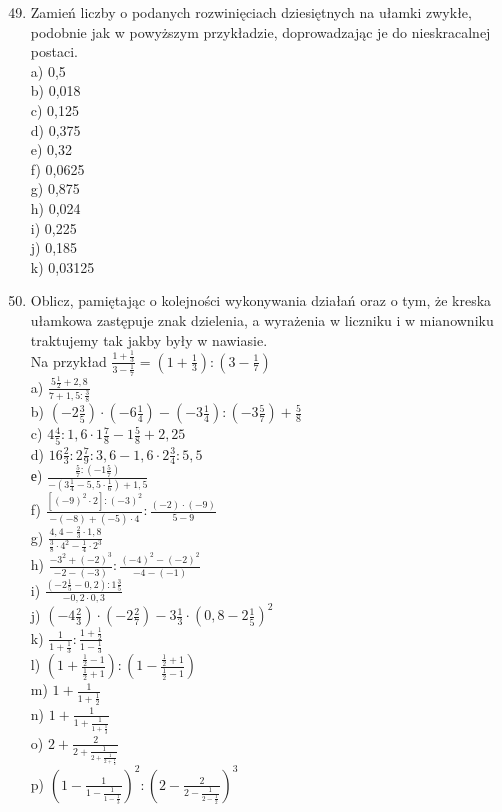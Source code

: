 \documentclass[10pt]{article}
\begin{document}
\begin{enumerate}
  \setcounter{enumi}{48}
  \item Zamień liczby o podanych rozwinięciach dziesiętnych na ułamki zwykłe, podobnie jak w powyższym przykładzie, doprowadzając je do nieskracalnej postaci.\\
a) 0,5\\
b) 0,018\\
c) 0,125\\
d) 0,375\\
e) 0,32\\
f) 0,0625\\
g) 0,875\\
h) 0,024\\
i) 0,225\\
j) 0,185\\
k) 0,03125
  \item Oblicz, pamiętając o kolejności wykonywania działań oraz o tym, że kreska ułamkowa zastępuje znak dzielenia, a wyrażenia w liczniku i w mianowniku traktujemy tak jakby były w nawiasie.\\
Na przykład \(\frac{1+\frac{1}{3}}{3-\frac{1}{7}}=\left(1+\frac{1}{3}\right):\left(3-\frac{1}{7}\right)\)\\
a) \(\frac{5 \frac{1}{2}+2,8}{7+1,5: \frac{3}{8}}\)\\
b) \(\left(-2 \frac{3}{5}\right) \cdot\left(-6 \frac{1}{4}\right)-\left(-3 \frac{1}{4}\right):\left(-3 \frac{5}{7}\right)+\frac{5}{8}\)\\
c) \(4 \frac{4}{5}: 1,6 \cdot 1 \frac{7}{8}-1 \frac{5}{8}+2,25\)\\
d) \(16 \frac{2}{3}: 2 \frac{7}{9}: 3,6-1,6 \cdot 2 \frac{3}{4}: 5,5\)\\
е) \(\frac{\frac{5}{7}:\left(-1 \frac{5}{7}\right)}{-\left(3 \frac{1}{4}-5,5 \cdot \frac{1}{6}\right)+1,5}\)\\
f) \(\frac{\left[(-9)^{2} \cdot 2\right]:(-3)^{2}}{-(-8)+(-5) \cdot 4}: \frac{(-2) \cdot(-9)}{5-9}\)\\
g) \(\frac{4,4-\frac{2}{3} \cdot 1,8}{\frac{3}{8} \cdot 4^{2}-\frac{1}{4} \cdot 2^{3}}\)\\
h) \(\frac{-3^{2}+(-2)^{3}}{-2-(-3)}: \frac{(-4)^{2}-(-2)^{2}}{-4-(-1)}\)\\
i) \(\frac{\left(-2 \frac{1}{5}-0,2\right): 1 \frac{3}{5}}{-0,2 \cdot 0,3}\)\\
j) \(\left(-4 \frac{2}{3}\right) \cdot\left(-2 \frac{2}{7}\right)-3 \frac{1}{3} \cdot\left(0,8-2 \frac{1}{5}\right)^{2}\)\\
k) \(\frac{1}{1+\frac{1}{3}}: \frac{1+\frac{1}{2}}{1-\frac{1}{3}}\)\\
l) \(\left(1+\frac{\frac{1}{2}-1}{\frac{1}{2}+1}\right):\left(1-\frac{\frac{1}{2}+1}{\frac{1}{2}-1}\right)\)\\
m) \(1+\frac{1}{1+\frac{1}{2}}\)\\
n) \(1+\frac{1}{1+\frac{1}{1+\frac{1}{3}}}\)\\
o) \(2+\frac{2}{2+\frac{1}{2+\frac{1}{2+\frac{1}{2}}}}\)\\
p) \(\left(1-\frac{1}{1-\frac{1}{1-\frac{1}{3}}}\right)^{2}:\left(2-\frac{2}{2-\frac{1}{2-\frac{1}{2}}}\right)^{3}\)
\end{enumerate}
\end{document}
